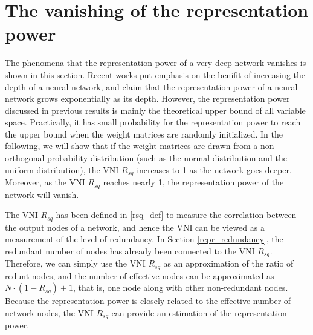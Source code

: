 \fi


\section{The vanishing of the representation power} \label{repr_general}

The phenomena that the representation power of a very deep network vanishes
is shown in this section.
Recent works \cite{mft:expo, expressive, linear_regions, expr_power, relu_understand,
relu_benifit, relu_approx} put emphasis on the benifit of increasing the depth of a neural network,
and claim that the representation power of a neural network grows exponentially as its depth. 
However, the representation power discussed in previous results is mainly the theoretical upper bound of
all variable space.
Practically, it has small probability for the representation power to reach the upper bound when
the weight matrices are randomly initialized.
In the following, we will show that if the weight matrices are drawn from a non-orthogonal
probability distribution (such as the normal distribution and the uniform distribution), the VNI
$R_{sq}$ increases to 1 as the network goes deeper. Moreover, as the VNI $R_{sq}$ reaches nearly 1,
the representation power of the network will vanish.

The VNI $R_{sq}$ has been defined in \eqref{rsq_def} to measure the correlation between the output nodes of
a network, and hence the VNI can be viewed as a measurement of the level of redundancy.
In Section \ref{repr_redundancy}, the redundant number of nodes has already been connected to the
VNI $R_{sq}$. Therefore, we can simply use the VNI $R_{sq}$ as an approximation of the ratio of redunt
nodes, and the number of effective nodes can be approximated as $N\cdot(1-R_{sq})+1$, that is,
one node along with other non-redundant nodes.
Because the representation power is closely related to the effective number of network nodes, the VNI
$R_{sq}$ can provide an estimation of the representation power.
 
